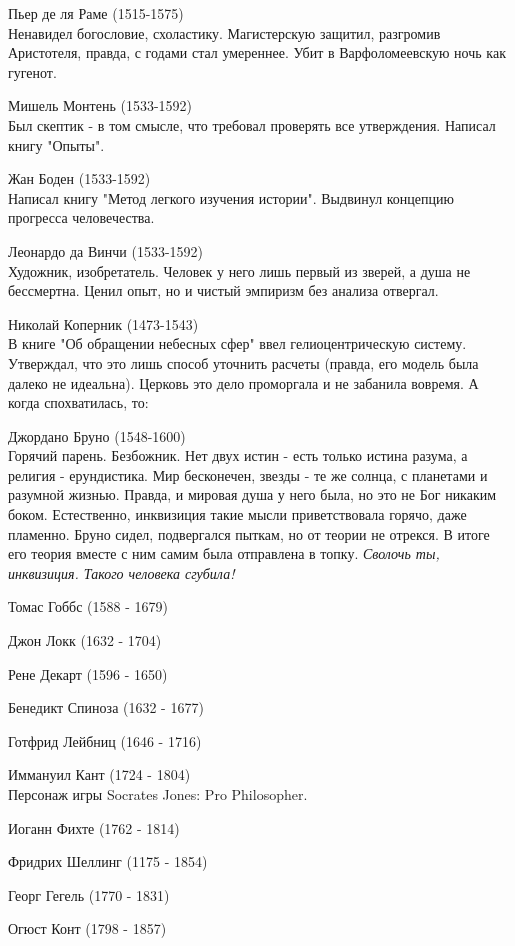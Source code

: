 \documentclass[12pt,a4paper]{article}
\begin{document}
Пьер де ля Раме (1515-1575)\\
Ненавидел богословие, схоластику. Магистерскую защитил, разгромив Аристотеля, правда, с годами стал умереннее. Убит в Варфоломеевскую ночь как гугенот.

Мишель Монтень (1533-1592)\\
Был скептик - в том смысле, что требовал проверять все утверждения. Написал книгу "Опыты".

Жан Боден (1533-1592)\\Написал книгу "Метод легкого изучения истории". Выдвинул концепцию прогресса человечества.

Леонардо да Винчи (1533-1592)\\
Художник, изобретатель. Человек у него лишь первый из зверей, а душа не бессмертна. Ценил опыт, но и чистый эмпиризм без анализа отвергал.

Николай Коперник (1473-1543)\\
В книге "Об обращении небесных сфер" ввел гелиоцентрическую систему. Утверждал, что это лишь способ уточнить расчеты (правда, его модель была далеко не идеальна). Церковь это дело проморгала и не забанила вовремя. А когда спохватилась, то:

Джордано Бруно (1548-1600)\\
Горячий парень. Безбожник. Нет двух истин - есть только истина разума, а религия - ерундистика. Мир бесконечен, звезды - те же солнца, с планетами и разумной жизнью. Правда, и мировая душа у него была, но это не Бог никаким боком. Естественно, инквизиция такие мысли приветствовала горячо, даже пламенно. Бруно сидел, подвергался пыткам, но от теории не отрекся. В итоге его теория вместе с ним самим была отправлена в топку. \textit{Сволочь ты, инквизиция. Такого человека сгубила!}

Томас Гоббс (1588 - 1679)

Джон Локк (1632 - 1704)

Рене Декарт (1596 - 1650)

Бенедикт Спиноза (1632 - 1677)

Готфрид Лейбниц (1646 - 1716)

Иммануил Кант (1724 - 1804)\\
Персонаж игры Socrates Jones: Pro Philosopher.

Иоганн Фихте (1762 - 1814)

Фридрих Шеллинг (1175 - 1854)

Георг Гегель (1770 - 1831)

Огюст Конт (1798 - 1857)
\end{document}
